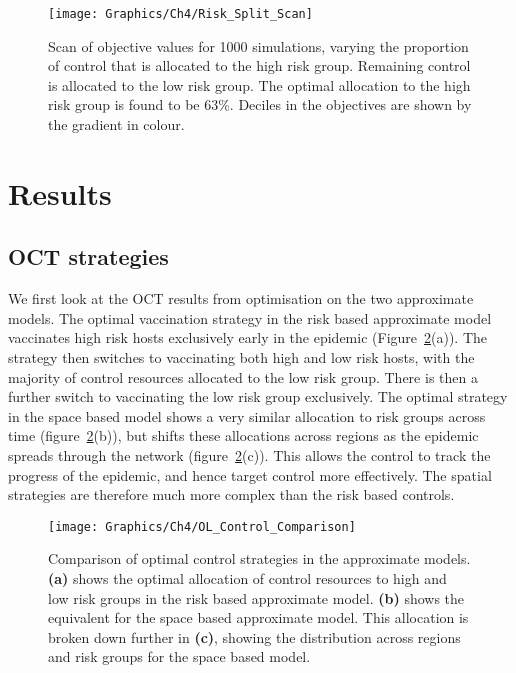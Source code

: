 \begin{figure}[t!]
    \begin{center}
        \texttt{[image: Graphics/Ch4/Risk\_Split\_Scan]}
        \caption[Optimisation of the Split strategy]{Scan of objective values for 1000 simulations, varying the proportion of control that is allocated to the high risk group. Remaining control is allocated to the low risk group. The optimal allocation to the high risk group is found to be 63\%. Deciles in the objectives are shown by the gradient in colour.}
        \label{fig:ch4:risk_split_scan}
    \end{center}
\end{figure}

\FloatBarrier
\newpage
\section{Results\label{sec:ch4:Results}}

\subsection{OCT strategies}

We first look at the OCT results from optimisation on the two approximate models. The optimal vaccination strategy in the risk based approximate model vaccinates high risk hosts exclusively early in the epidemic (Figure~\ref{fig:ch4:opt_control_comparison}(a)). The strategy then switches to vaccinating both high and low risk hosts, with the majority of control resources allocated to the low risk group. There is then a further switch to vaccinating the low risk group exclusively. The optimal strategy in the space based model shows a very similar allocation to risk groups across time (figure~\ref{fig:ch4:opt_control_comparison}(b)), but shifts these allocations across regions as the epidemic spreads through the network (figure~\ref{fig:ch4:opt_control_comparison}(c)). This allows the control to track the progress of the epidemic, and hence target control more effectively. The spatial strategies are therefore much more complex than the risk based controls.

\begin{figure}[h]
    \begin{center}
        \texttt{[image: Graphics/Ch4/OL\_Control\_Comparison]}
        \caption[Optimised time-dependent control strategies]{Comparison of optimal control strategies in the approximate models. \textbf{(a)} shows the optimal allocation of control resources to high and low risk groups in the risk based approximate model. \textbf{(b)} shows the equivalent for the space based approximate model. This allocation is broken down further in \textbf{(c)}, showing the distribution across regions and risk groups for the space based model.}
        \label{fig:ch4:opt_control_comparison}
    \end{center}
\end{figure}

